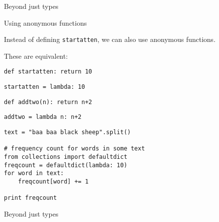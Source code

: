 \documentclass{beamer}
\begin{document}
\begin{frame}{Beyond just types}
 
\vspace{1.5em}
{\usebox{\mysavebox}}


\vspace{1em}
\end{frame}

\begin{frame}{Using anonymous functions}


Instead of defining \lstinline$startatten$, we can also use anonymous functions.

\bigskip

These are equivalent:

\bigskip

\lstinline$def startatten: return 10$

\lstinline$startatten = lambda: 10$

\bigskip

\lstinline$def addtwo(n): return n+2 $

\lstinline$addtwo = lambda n: n+2$

\end{frame}


\begin{lrbox}{\mysavebox}
\begin{lstlisting}
text = "baa baa black sheep".split()

# frequency count for words in some text
from collections import defaultdict
freqcount = defaultdict(lambda: 10)
for word in text:
    freqcount[word] += 1

print freqcount 
\end{lstlisting}
\end{lrbox}

\begin{frame}{Beyond just types}
 
\vspace{-1em}
{\usebox{\mysavebox}}


\vspace{1em}
\end{frame}
\end{document}
